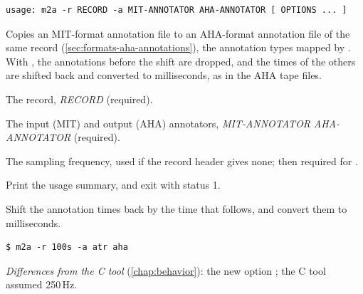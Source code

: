 \begin{lstlisting}[style=signature,language={}]
usage: m2a -r RECORD -a MIT-ANNOTATOR AHA-ANNOTATOR [ OPTIONS ... ]
\end{lstlisting}
Copies an MIT-format annotation file to an AHA-format annotation file of the same record
(\cref{sec:formats-aha-annotations}), the annotation types mapped by . With
, the annotations before the shift are dropped, and the times of the others are
shifted back and converted to milliseconds, as in the AHA tape files.
\begin{params}
\item[-r] The record, \textit{RECORD} (required).
\item[-a] The input (MIT) and output (AHA) annotators, \textit{MIT-ANNOTATOR}
  \textit{AHA-ANNOTATOR} (required).
\item[-F] The sampling frequency, used if the record header gives none; then required
  for .
\item[-h] Print the usage summary, and exit with status 1.
\item[-s] Shift the annotation times back by the time that follows, and convert them to
  milliseconds.
\end{params}
\begin{lstlisting}[style=text]
$ m2a -r 100s -a atr aha
\end{lstlisting}
\textit{Differences from the C tool} (\cref{chap:behavior}): the new option ; the C
tool assumed 250\,Hz.

